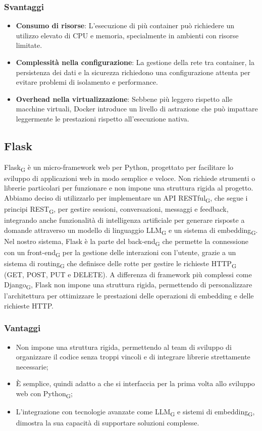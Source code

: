 \subsubsection{Svantaggi}
\begin{itemize}
    \item \textbf{Consumo di risorse}: L’esecuzione di più container può richiedere un utilizzo elevato di CPU e memoria, specialmente in ambienti con risorse limitate.
    \item \textbf{Complessità nella configurazione}: La gestione della rete tra container, la persistenza dei dati e la sicurezza richiedono una configurazione attenta per evitare problemi di isolamento e performance.
    \item \textbf{Overhead nella virtualizzazione}: Sebbene più leggero rispetto alle macchine virtuali, Docker introduce un livello di astrazione che può impattare leggermente le prestazioni rispetto all’esecuzione nativa.
\end{itemize}
\subsection{Flask}
Flask\textsubscript{G} è un micro-framework web per Python, progettato per facilitare lo sviluppo di applicazioni web in modo semplice e veloce. Non richiede strumenti o librerie particolari per funzionare e non impone una struttura rigida al progetto. Abbiamo deciso di utilizzarlo per implementare un API RESTful\textsubscript{G}, che segue i principi REST\textsubscript{G}, per gestire sessioni, conversazioni, messaggi e feedback, integrando anche funzionalità di intelligenza artificiale per generare risposte a domande attraverso un modello di linguaggio LLM\textsubscript{G} e un sistema di embedding\textsubscript{G}. Nel nostro sistema, Flask è la parte del back-end\textsubscript{G} che permette la connessione con un front-end\textsubscript{G} per la gestione delle interazioni con l'utente, grazie a un sistema di routing\textsubscript{G} che definisce delle rotte per gestire le richieste HTTP\textsubscript{G} (GET, POST, PUT e DELETE). A differenza di framework più complessi come Django\textsubscript{G}, Flask non impone una struttura rigida, permettendo di personalizzare l'architettura per ottimizzare le prestazioni delle operazioni di embedding e delle richieste HTTP.
\subsubsection{Vantaggi}
\begin{itemize}
    \item Non impone una struttura rigida, permettendo al team di sviluppo di organizzare il codice senza troppi vincoli e di integrare librerie strettamente necessarie;
    \item È semplice, quindi adatto a che si interfaccia per la prima volta allo sviluppo web con Python\textsubscript{G};
    \item L'integrazione con tecnologie avanzate come LLM\textsubscript{G} e sistemi di embedding\textsubscript{G}, dimostra la sua capacità di supportare soluzioni complesse.
\end{itemize}
